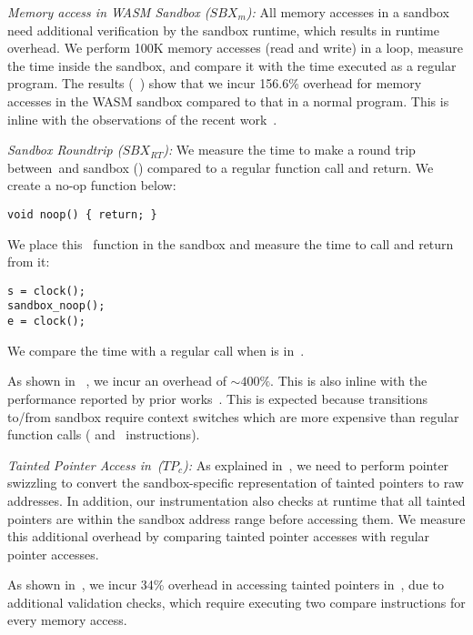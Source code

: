 \noindent\emph{Memory access in WASM Sandbox ($SBX_{m}$):} 
All memory accesses in a sandbox need additional verification by the sandbox runtime, which results in runtime overhead.
We perform 100K memory accesses (read and write) in a loop, measure the time inside the sandbox, and compare it with the time executed as a regular program.
%
The results (~) show that we incur 156.6\% overhead for memory accesses in the WASM sandbox compared to that in a normal program.
This is inline with the observations of the recent work~\cite{jangda2019not}.

\noindent\emph{Sandbox Roundtrip ($SBX_{RT}$):}
We measure the time to make a round trip between~\cregion and sandbox (\ucregion) compared to a regular function call and return.
We create a no-op function below:
\begin{verbatim}
void noop() { return; }
\end{verbatim}
We place this~ function in the sandbox and measure the time to call and return from it:
\begin{verbatim}
s = clock();
sandbox_noop();
e = clock();
\end{verbatim}
We compare the time with a regular call when  is in~\cregion.

As shown in ~, we incur an overhead of $\sim 400\%$. This is also inline with the performance reported by prior works~\cite{jangda2019not, rlbox-paper}.
This is expected because transitions to/from sandbox require context switches which are more expensive than regular function calls (\ie{} and~ instructions).

\noindent\emph{Tainted Pointer Access in~\cregion ($TP_{c}$):}
As explained in~, we need to perform pointer swizzling to convert the sandbox-specific representation of tainted pointers to raw addresses.
In addition, our instrumentation also checks at runtime that all tainted pointers are within the sandbox address range before accessing them.
We measure this additional overhead by comparing tainted pointer accesses with regular pointer accesses.

As shown in~, we incur 34\% overhead in accessing tainted pointers in~\cregion,
 due to additional validation checks, which require executing two compare instructions for every memory access.


